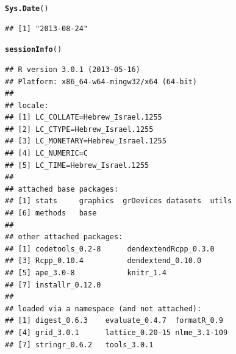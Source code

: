 \documentclass[shortnames,nojss,article]{jss}\usepackage[]{graphicx}\usepackage[]{color}
\makeatletter
\newcommand{\hlstd}[1]{\textcolor[rgb]{0.345,0.345,0.345}{#1}}%
\newcommand{\hlkwd}[1]{\textcolor[rgb]{0.737,0.353,0.396}{\textbf{#1}}}%
\newenvironment{kframe}{%
 \def\at@end@of@kframe{}%
 \ifinner\ifhmode%
  \def\at@end@of@kframe{\end{minipage}}%
  \begin{minipage}{\columnwidth}%
 \fi\fi%
 \def\FrameCommand##1{\hskip\@totalleftmargin \hskip-\fboxsep
 \colorbox{shadecolor}{##1}\hskip-\fboxsep
     \hskip-\linewidth \hskip-\@totalleftmargin \hskip\columnwidth}%
 \MakeFramed {\advance\hsize-\width
   \@totalleftmargin\z@ \linewidth\hsize
   \@setminipage}}%
 {\par\unskip\endMakeFramed%
 \at@end@of@kframe}
\newenvironment{knitrout}{}{} %
\makeatother
\begin{document}
\begin{knitrout}
\color{fgcolor}\begin{kframe}
\begin{alltt}
\hlkwd{Sys.Date}\hlstd{()}
\end{alltt}
\begin{verbatim}
## [1] "2013-08-24"
\end{verbatim}
\begin{alltt}
\hlkwd{sessionInfo}\hlstd{()}
\end{alltt}
\begin{verbatim}
## R version 3.0.1 (2013-05-16)
## Platform: x86_64-w64-mingw32/x64 (64-bit)
## 
## locale:
## [1] LC_COLLATE=Hebrew_Israel.1255 
## [2] LC_CTYPE=Hebrew_Israel.1255   
## [3] LC_MONETARY=Hebrew_Israel.1255
## [4] LC_NUMERIC=C                  
## [5] LC_TIME=Hebrew_Israel.1255    
## 
## attached base packages:
## [1] stats     graphics  grDevices datasets  utils    
## [6] methods   base     
## 
## other attached packages:
## [1] codetools_0.2-8      dendextendRcpp_0.3.0
## [3] Rcpp_0.10.4          dendextend_0.10.0   
## [5] ape_3.0-8            knitr_1.4           
## [7] installr_0.12.0     
## 
## loaded via a namespace (and not attached):
## [1] digest_0.6.3    evaluate_0.4.7  formatR_0.9    
## [4] grid_3.0.1      lattice_0.20-15 nlme_3.1-109   
## [7] stringr_0.6.2   tools_3.0.1
\end{verbatim}
\end{kframe}
\end{knitrout}
\end{document}

